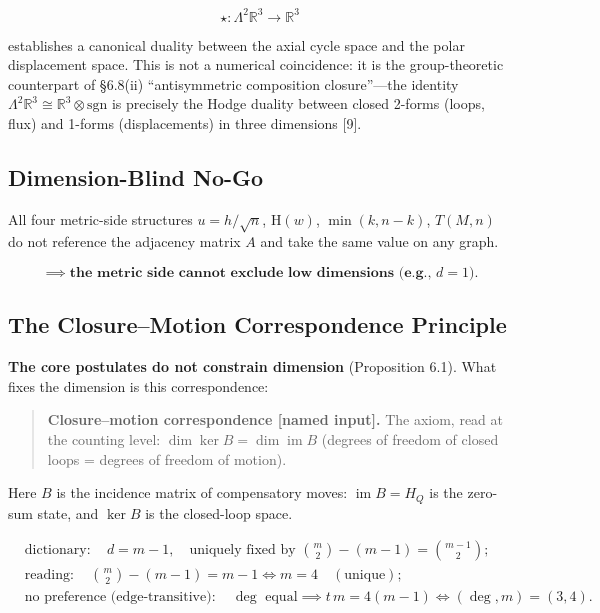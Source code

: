 \documentclass[
  11pt,
]{article}
\begin{document}
\[
\star:\Lambda^2\mathbb R^3\longrightarrow\mathbb R^3
\]

establishes a canonical duality between the axial cycle space and the
polar displacement space. This is not a numerical coincidence: it is the
group-theoretic counterpart of §6.8(ii) ``antisymmetric composition
closure''---the identity
\(\Lambda^2\mathbb R^3\cong\mathbb R^3\otimes\mathrm{sgn}\) is precisely
the Hodge duality between closed 2-forms (loops, flux) and 1-forms
(displacements) in three dimensions {[}9{]}.

\subsection{Dimension-Blind No-Go}\label{dimension-blind-no-go}

All four metric-side structures \(u=h/\sqrt n\), \(\mathrm H(w)\),
\(\min(k,n-k)\), \(T(M,n)\) do not reference the adjacency matrix \(A\)
and take the same value on any graph.

\[
\implies \textbf{the metric side cannot exclude low dimensions (e.g., }d=1\text{)}.
\tag{6.3}
\]

\subsection{The Closure--Motion Correspondence
Principle}\label{the-closuremotion-correspondence-principle}

\textbf{The core postulates do not constrain dimension} (Proposition
6.1). What fixes the dimension is this correspondence:

\begin{quote}
\textbf{Closure--motion correspondence {[}named input{]}.} The axiom,
read at the counting level: \(\dim\ker B=\dim\operatorname{im}B\)
(degrees of freedom of closed loops = degrees of freedom of motion).
\end{quote}

Here \(B\) is the incidence matrix of compensatory moves:
\(\operatorname{im}B=H_Q\) is the zero-sum state, and \(\ker B\) is the
closed-loop space.

\begin{align}
&\text{dictionary}: \quad d=m-1, \quad \text{uniquely fixed by } \binom m2-(m-1)=\binom{m-1}2;\\
&\text{reading}: \quad \binom m2-(m-1)=m-1 \iff m=4 \quad(\text{unique});\\
&\text{no preference (edge-transitive)}: \quad \deg\text{ equal} \implies t\,m=4(m-1) \iff (\deg,m)=(3,4).
\end{align}
\end{document}

